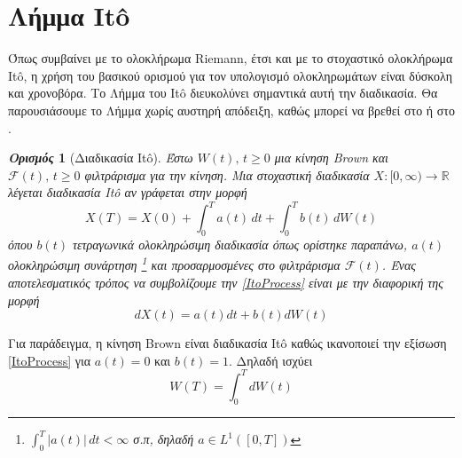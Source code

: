 \documentclass[12pt,a4paper,twoside,openany]{book}
\newtheorem{definition}{\textit{Ορισμός}}[section]
\begin{document}
\section{Λήμμα Itô} \label{Ito Lemma}
\vspace{2.5mm}		
	Όπως συμβαίνει με το ολοκλήρωμα Riemann, έτσι και με το στοχαστικό ολοκλήρωμα Itô, η χρήση του βασικού ορισμού για τον υπολογισμό ολοκληρωμάτων είναι δύσκολη και χρονοβόρα. Το Λήμμα του Itô διευκολύνει σημαντικά αυτή την διαδικασία. Θα παρουσιάσουμε το Λήμμα χωρίς αυστηρή απόδειξη, καθώς μπορεί να βρεθεί στο \cite{Shreve} ή στο \cite{Oksendal}.
	\begin{definition}[Διαδικασία Itô]
		Έστω $W(t),\, t\geq0$ μια κίνηση Brown και $\mathcal{F}(t),\, t\geq0$ φιλτράρισμα για την κίνηση. Μια στοχαστική διαδικασία $X:[0,\infty)\rightarrow\mathbb{R}$ λέγεται διαδικασία Itô αν γράφεται στην μορφή 
		\[X(T)= X(0)+\int_{0}^{T}a(t)\, dt + \int_{0}^{T}b(t)\, dW(t) \label{ItoProcess}\tag{2.3.1}\]
		όπου $b(t)$ τετραγωνικά ολοκληρώσιμη διαδικασία όπως ορίστηκε παραπάνω, $a(t)$ ολοκληρώσιμη συνάρτηση \footnote{$\int_{0}^{T}|a(t)|\, dt<\infty$ σ.π, δηλαδή $a\in L^1([0,T])$} και προσαρμοσμένες στο φιλτράρισμα $\mathcal{F}(t)$. Ένας αποτελεσματικός τρόπος να συμβολίζουμε την \eqref{ItoProcess} είναι με την διαφορική της μορφή \[dX(t)= a(t)dt + b(t)dW(t) \]
	\end{definition}
	\vspace{2.5mm}
	\noindent Για παράδειγμα, η κίνηση Brown είναι διαδικασία Itô καθώς ικανοποιεί την εξίσωση \eqref{ItoProcess} για $a(t)=0$ και $b(t)=1$. Δηλαδή ισχύει 
	\[W(T)= \int_{0}^{T}dW(t) \]\vspace{2.5mm}
	
\end{document}
